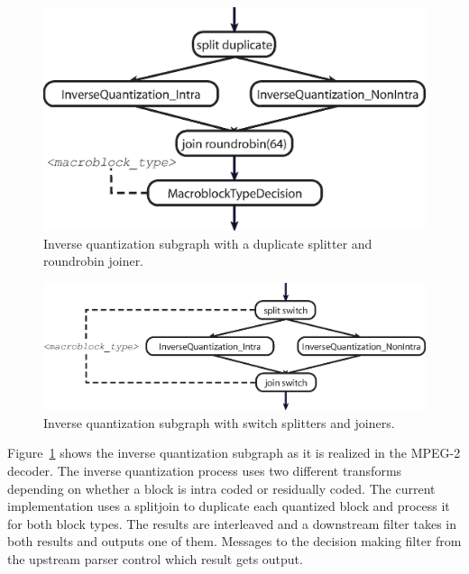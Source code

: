 \begin{figure}[t]
  \begin{center}
    \includegraphics[scale=0.5, angle=0]{./inverse_quantization.eps}
    \caption{Inverse quantization subgraph with a duplicate splitter and roundrobin joiner.}
    \label{fig:inversequant}
  \end{center}
\end{figure}

\begin{figure}[t]
  \begin{center}
    \includegraphics[scale=0.5, angle=0]{./inverse_quantization_switch.eps}
    \caption{Inverse quantization subgraph with switch splitters and joiners.}
    \label{fig:inversequant_switch}
  \end{center}
\end{figure}

Figure~\ref{fig:inversequant} shows the inverse quantization subgraph as it is realized in the 
MPEG-2 decoder. The inverse quantization process uses two different transforms depending on whether 
a block is intra coded or residually coded. The current implementation uses a splitjoin to 
duplicate each quantized block and process it for both block types. The results are interleaved 
and a downstream filter takes in both results and outputs one of them. Messages to the decision 
making filter from the upstream parser control which result gets output.

